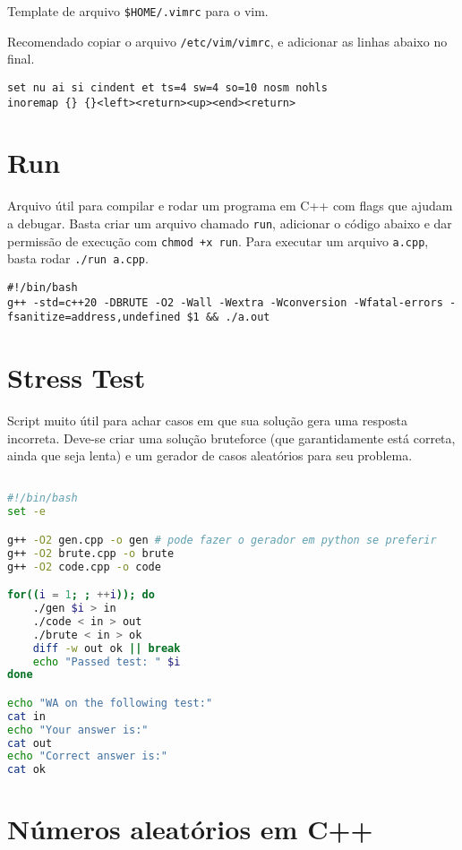 Template de arquivo \texttt{\$HOME/.vimrc} para o vim.

Recomendado copiar o arquivo \texttt{/etc/vim/vimrc}, e adicionar as linhas abaixo no final.

\begin{lstlisting}
set nu ai si cindent et ts=4 sw=4 so=10 nosm nohls
inoremap {} {}<left><return><up><end><return>
\end{lstlisting}

\section{Run}

Arquivo útil para compilar e rodar um programa em C++ com flags que ajudam a debugar.
Basta criar um arquivo chamado \texttt{run}, adicionar o código abaixo e dar permissão de execução com \texttt{chmod +x run}.
Para executar um arquivo \texttt{a.cpp}, basta rodar \texttt{./run a.cpp}.

\begin{lstlisting}
#!/bin/bash
g++ -std=c++20 -DBRUTE -O2 -Wall -Wextra -Wconversion -Wfatal-errors -fsanitize=address,undefined $1 && ./a.out
\end{lstlisting}

\section{Stress Test}

Script muito útil para achar casos em que sua solução gera uma resposta incorreta.
Deve-se criar uma solução bruteforce (que garantidamente está correta, ainda que seja lenta) e um gerador de casos aleatórios para seu problema.

\begin{lstlisting}[language=Bash]

#!/bin/bash
set -e

g++ -O2 gen.cpp -o gen # pode fazer o gerador em python se preferir
g++ -O2 brute.cpp -o brute
g++ -O2 code.cpp -o code

for((i = 1; ; ++i)); do
    ./gen $i > in
    ./code < in > out
    ./brute < in > ok
    diff -w out ok || break
    echo "Passed test: " $i
done

echo "WA on the following test:"
cat in
echo "Your answer is:"
cat out
echo "Correct answer is:"
cat ok

\end{lstlisting}

\section{Números aleatórios em C++}

